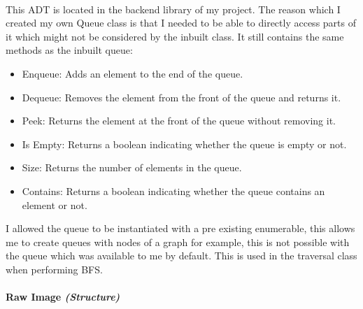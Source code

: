 \begin{FlushLeft}
    \begin{figure}[H]
        \centering
    \end{figure}\\

    This ADT is located in the backend library of my project. The reason which I created my own Queue class is that I needed to be able to directly access parts of it which might not be considered by the inbuilt class. It still contains the same methods as the inbuilt queue:\\ \bk

    \begin{itemize}
        \item Enqueue: Adds an element to the end of the queue.
        \item Dequeue: Removes the element from the front of the queue and returns it.
        \item Peek: Returns the element at the front of the queue without removing it.
        \item Is Empty: Returns a boolean indicating whether the queue is empty or not.
        \item Size: Returns the number of elements in the queue.
        \item Contains: Returns a boolean indicating whether the queue contains an element or not.
    \end{itemize}

    I allowed the queue to be instantiated with a pre existing enumerable, this allows me to create queues with nodes of a graph for example, this is not possible with the queue which was available to me by default. This is used in the traversal class when performing BFS.\\

    \bk

    \pagebreak
\paragraph{Raw Image \textit{(Structure)}} \mbox{} \\


\end{FlushLeft}
